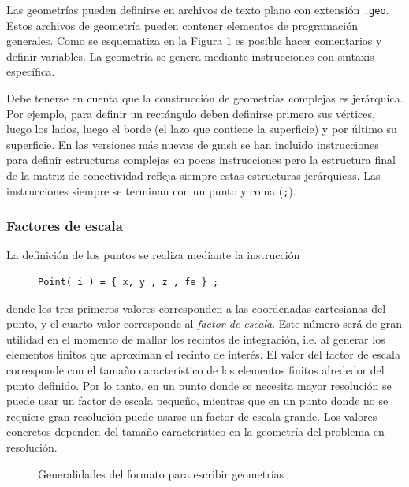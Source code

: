 
Las geometrías pueden definirse en archivos de texto plano con
extensión \texttt{.geo}. Estos archivos de geometría pueden
contener elementos de programación generales. Como se
esquematiza en la Figura \ref{FiguraEjemploGeometrias} 
es posible hacer comentarios y definir variables. La geometría
se genera mediante instrucciones con sintaxis específica. 

Debe tenerse en cuenta que la construcción de geometrías 
complejas es jerárquica. Por ejemplo, para definir un 
rectángulo deben definirse primero sus vértices, luego 
los lados, luego el borde (el lazo que contiene la superficie) y
por último su superficie. En las versiones más nuevas de gmsh
se han incluido instrucciones para definir estructuras complejas
en pocas instrucciones pero la estructura final de la 
matriz de conectividad refleja siempre estas estructuras jerárquicas. 
Las instrucciones siempre se terminan con un punto y coma (\texttt{;}).

\subsubsection{Factores de escala}
La definición de los puntos se realiza mediante la instrucción

\begin{figure}[h]
  \center
\begin{codeblock}
  \begin{BVerbatim}[fontfamily=courier]
Point( i ) = { x, y , z , fe } ;
\end{BVerbatim}
\end{codeblock}
\end{figure}

\noindent donde los tres primeros valores corresponden a las coordenadas
cartesianas del punto, y el cuarto valor corresponde al 
\emph{factor de escala}. Este número será de gran utilidad
en el momento de mallar los recintos de integración, i.e. al 
generar los elementos finitos que aproximan el recinto de interés. 
El valor del factor de escala corresponde con el tamaño 
característico de los elementos finitos alrededor del punto
definido. Por lo tanto, en un punto donde se necesita 
mayor resolución se puede usar un factor de escala pequeño,
mientras que en un punto donde no se requiere gran resolución
puede usarse un factor de escala grande. Los valores 
concretos dependen del tamaño característico en la geometría 
del problema en resolución. 

\begin{figure}
  \caption{Generalidades del formato para escribir geometrías
  \label{FiguraEjemploGeometrias}
  }

\end{figure}

